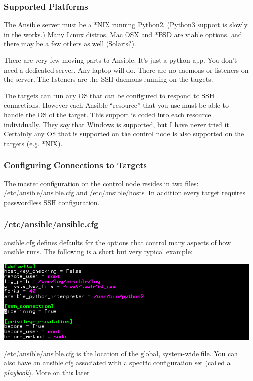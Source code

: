 \documentclass[helvetica,english,utf8,notitle,nologo]{beamer}
\begin{document}
\begin{frame}
  \frametitle{Supported Platforms}

  The Ansible server must be a *NIX running Python2. (Python3 support
  is slowly in the works.) Many Linux distros, Mac OSX and *BSD are
  viable options, and there may be a few others as well (Solaris?).

  There are very few moving parts to Ansible. It's just a python
  app. You don't need a dedicated server. Any laptop will do. There
  are no daemons or listeners on the server. The listeners are the SSH
  daemons running on the targets.

  The targets can run any OS that can be configured to respond to SSH
  connections. However each Ansible ``resource'' that you use must be
  able to handle the OS of the target. This support is coded into each
  resource individually. They say that Windows is supported, but I
  have never tried it. Certainly any OS that is supported on the
  control node is also supported on the targets (e.g. *NIX).
\end{frame}

\begin{frame}
  \frametitle{Configuring Connections to Targets}

  The master configuration on the control node resides in two files:
  /etc/ansible/ansible.cfg and /etc/ansible/hosts. In addition every
  target requires passwordless SSH configuration.
\end{frame}

\begin{frame}
  \frametitle{/etc/ansible/ansible.cfg}

  ansible.cfg defines defaults for the options that control many
  aspects of how ansible runs. The following is a short but very
  typical example:

  \includegraphics[scale=0.44]{img_1}

  /etc/ansible/ansible.cfg is the location of the global, system-wide
  file. You can also have an ansible.cfg associated with a specific
  configuration set (called a \textit{playbook}). More on this later.
\end{frame}
\end{document}
